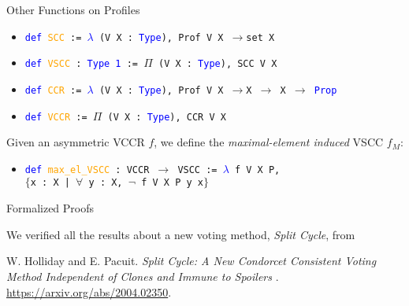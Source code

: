 \documentclass[12pt,xcolor=svgnames,blue,aspectratio=169]{beamer}
\newcommand{\paper}[3]{\colorbox{gray!20}{%
\begin{minipage}{\textwidth}\footnotesize #1.
\textit{#2}. #3.\end{minipage}}}
\begin{document}
\begin{frame}{Other Functions on Profiles}

\begin{itemize}
\item[] \texttt{\textcolor{blue}{def} \textcolor{orange}{SCC} := \textcolor{blue}{$\lambda$} (V X : \textcolor{blue}{Type}), Prof V X $\to$\colorbox{gray!30}{set X}}
\end{itemize}
\begin{itemize}
\item[] \texttt{\textcolor{blue}{def} \textcolor{orange}{VSCC} : \textcolor{blue}{Type 1} := $\Pi$ (V X : \textcolor{blue}{Type}), SCC V X}
\end{itemize}

\vfill 

\pause 

 \begin{itemize}
\item[] \texttt{\textcolor{blue}{def} \textcolor{orange}{CCR} := \textcolor{blue}{$\lambda$} (V X : \textcolor{blue}{Type}), Prof V X $\to$\colorbox{gray!30}{X $\to$ X $\to$ \textcolor{blue}{Prop}}}
\end{itemize}
\begin{itemize}
\item[] \texttt{\textcolor{blue}{def} \textcolor{orange}{VCCR} := $\Pi$ (V X : \textcolor{blue}{Type}), CCR V X}
\end{itemize}


\vfill 
\pause 


Given an asymmetric VCCR $f$, we define the \textit{maximal-element induced} VSCC $f_{M}$: 

\begin{itemize}
\item[] \texttt{\textcolor{blue}{def} \textcolor{orange}{max\_el\_VSCC} : VCCR $\to$ VSCC := \textcolor{blue}{$\lambda$} f V X P,} \\
\texttt{$\{$x : X | $\forall$ y : X, $\neg$ f V X P y x$\}$}
\end{itemize}

\end{frame}
\begin{frame}{Formalized Proofs}

 
We verified  all the results about a new voting method, {\em Split Cycle}, from

\bigskip

\paper{W. Holliday and E. Pacuit}{Split Cycle: A New Condorcet Consistent Voting Method Independent of Clones and Immune to Spoilers
}{\url{https://arxiv.org/abs/2004.02350}}
 \end{frame}
 
\end{document}
